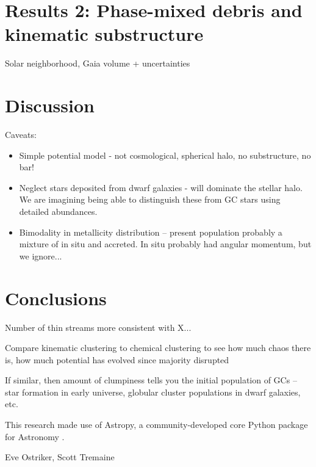 \documentclass[manuscript, letterpaper]{aastex6}
\begin{document}
\section{Results 2: Phase-mixed debris and kinematic substructure}

Solar neighborhood, Gaia volume + uncertainties

\section{Discussion}\label{sec:discussion}

Caveats:
\begin{itemize}
  \item Simple potential model - not cosmological, spherical halo, no
    substructure, no bar!
  \item Neglect stars deposited from dwarf galaxies - will dominate the stellar
    halo. We are imagining being able to distinguish these from GC stars using
    detailed abundances.
  \item Bimodality in metallicity distribution -- present population probably a
    mixture of in situ and accreted. In situ probably had angular momentum, but
    we ignore...
\end{itemize}

\section{Conclusions} \label{sec:conclusions}

Number of thin streams more consistent with X...

Compare kinematic clustering to chemical clustering to see how much chaos there
is, how much potential has evolved since majority disrupted

If similar, then amount of clumpiness tells you the initial population of GCs --
star formation in early universe, globular cluster populations in dwarf
galaxies, etc.

\acknowledgements
This research made use of
Astropy, a community-developed core Python package for Astronomy
\citep{Astropy-Collaboration:2013}.

Eve Ostriker, Scott Tremaine



\end{document}
